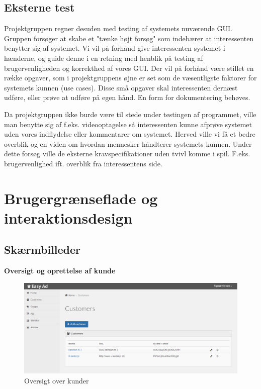 \documentclass[a4paper,12pt]{article}
\begin{document}
\subsection{Eksterne test}
Projektgruppen regner desuden med testing af systemets nuværende GUI. Gruppen forsøger at skabe et "tænke højt forsøg" som indebærer at interessenten benytter sig af systemet. Vi vil på forhånd give interessenten systemet i hænderne, og guide denne i en retning med henblik på testing af brugervenligheden og korrekthed af vores GUI. Der vil på forhånd være stillet en række opgaver, som i projektgruppens øjne er set som de væsentligste faktorer for systemets kunnen (use cases). Disse små opgaver skal interessenten dernæst udføre, eller prøve at udføre på egen hånd. En form for dokumentering behøves. 

Da projektgruppen ikke burde være til stede under testingen af programmet, ville man benytte sig af f.eks. videooptagelse så interessenten kunne afprøve systemet uden vores indflydelse eller kommentarer om systemet. Herved ville vi få et bedre overblik og en viden om hvordan mennesker håndterer systemets kunnen.
Under dette forsøg ville de eksterne kravspecifikationer uden tvivl komme i spil. F.eks. brugervenlighed ift. overblik fra
interessentens side.

\section{Brugergrænseflade og interaktionsdesign}
\subsection*{Skærmbilleder}
\textbf{Oversigt og oprettelse af kunde}
\begin{figure}[h!]
  \centering
    \includegraphics[width=\textwidth]{customers.png}
  \caption{Oversigt over kunder}
\end{figure}
\end{document}
